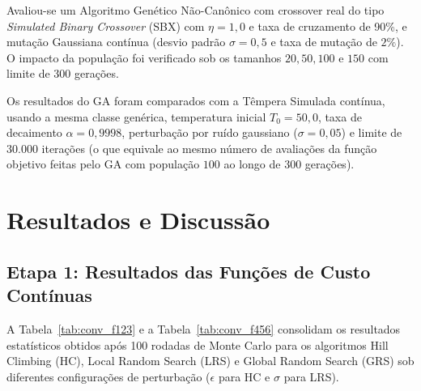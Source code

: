 \documentclass[journal,onecolumn]{IEEEtran}
\begin{document}
Avaliou-se um Algoritmo Genético Não-Canônico com crossover real do tipo \textit{Simulated Binary Crossover} (SBX) com $\eta = 1{,}0$ e taxa de cruzamento de 90\%, e mutação Gaussiana contínua (desvio padrão $\sigma = 0{,}5$ e taxa de mutação de $2\%$). O impacto da população foi verificado sob os tamanhos $20, 50, 100$ e $150$ com limite de $300$ gerações.

Os resultados do GA foram comparados com a Têmpera Simulada contínua, usando a mesma classe genérica, temperatura inicial $T_0=50{,}0$, taxa de decaimento $\alpha=0{,}9998$, perturbação por ruído gaussiano ($\sigma=0{,}05$) e limite de $30.000$ iterações (o que equivale ao mesmo número de avaliações da função objetivo feitas pelo GA com população $100$ ao longo de $300$ gerações).

\section{Resultados e Discussão}

\subsection{Etapa 1: Resultados das Funções de Custo Contínuas}
A Tabela~\ref{tab:conv_f123} e a Tabela~\ref{tab:conv_f456} consolidam os resultados estatísticos obtidos após 100 rodadas de Monte Carlo para os algoritmos Hill Climbing (HC), Local Random Search (LRS) e Global Random Search (GRS) sob diferentes configurações de perturbação ($\epsilon$ para HC e $\sigma$ para LRS).
\end{document}
